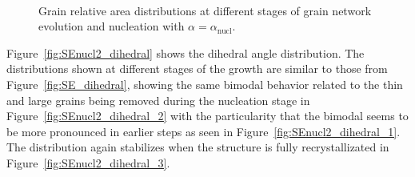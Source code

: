\begin{figure}[ht]
{    }\\%
    \caption{Grain relative area distributions at different stages of grain network evolution and nucleation with $\alpha = \alpha_{\text{nucl}}$.}
    \label{fig:SEnucl2_areas}
\end{figure}
%
Figure~\ref{fig:SEnucl2_dihedral} shows the dihedral angle distribution.
The distributions shown at different stages of the growth are similar to those from Figure~\ref{fig:SE_dihedral}, showing the same bimodal behavior related to the thin and large grains being removed during the nucleation stage in Figure~\ref{fig:SEnucl2_dihedral_2} with the particularity that the bimodal seems to be more pronounced in earlier steps as seen in Figure~\ref{fig:SEnucl2_dihedral_1}. The distribution again stabilizes when the structure is fully recrystallizated in Figure~\ref{fig:SEnucl2_dihedral_3}.

